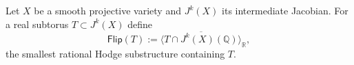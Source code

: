 \begin{definition}
Let $X$ be a smooth projective variety and $J^k(X)$ its intermediate Jacobian.
For a real subtorus $T \subset J^k(X)$ define
\[
\mathsf{Flip}(T)
:= \overline{\langle T \cap J^k(X)(\mathbb{Q}) \rangle}_{\mathbb{R}},
\]
the smallest rational Hodge substructure containing $T$.
\end{definition}

